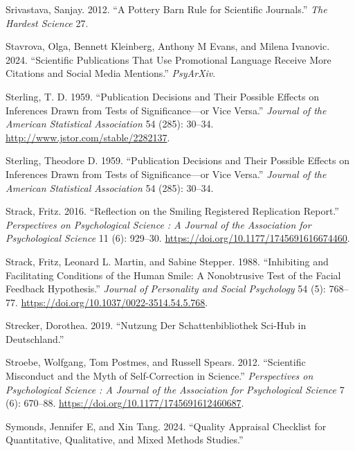 \documentclass[
  letterpaper,
  DIV=11,
  numbers=noendperiod]{scrreprt}
\newlength{\cslhangindent}
\newenvironment{CSLReferences}[2] %
 {\begin{list}{}{%
  \setlength{\itemindent}{0pt}
  \setlength{\leftmargin}{0pt}
  \setlength{\parsep}{0pt}
  \ifodd #1
   \setlength{\leftmargin}{\cslhangindent}
   \setlength{\itemindent}{-1\cslhangindent}
  \fi
  \setlength{\itemsep}{#2\baselineskip}}}
 {\end{list}}
\begin{document}
\begin{CSLReferences}{1}{0}
Srivastava, Sanjay. 2012. {``A Pottery Barn Rule for Scientific
Journals.''} \emph{The Hardest Science} 27.

Stavrova, Olga, Bennett Kleinberg, Anthony M Evans, and Milena Ivanovic.
2024. {``Scientific Publications That Use Promotional Language Receive
More Citations and Social Media Mentions.''} \emph{PsyArXiv}.

Sterling, T. D. 1959. {``Publication Decisions and Their Possible
Effects on Inferences Drawn from Tests of Significance---or Vice
Versa.''} \emph{Journal of the American Statistical Association} 54
(285): 30--34. \url{http://www.jstor.com/stable/2282137}.

Sterling, Theodore D. 1959. {``Publication Decisions and Their Possible
Effects on Inferences Drawn from Tests of Significance---or Vice
Versa.''} \emph{Journal of the American Statistical Association} 54
(285): 30--34.

Strack, Fritz. 2016. {``Reflection on the Smiling Registered Replication
Report.''} \emph{Perspectives on Psychological Science : A Journal of
the Association for Psychological Science} 11 (6): 929--30.
\url{https://doi.org/10.1177/1745691616674460}.

Strack, Fritz, Leonard L. Martin, and Sabine Stepper. 1988.
{``Inhibiting and Facilitating Conditions of the Human Smile: A
Nonobtrusive Test of the Facial Feedback Hypothesis.''} \emph{Journal of
Personality and Social Psychology} 54 (5): 768--77.
\url{https://doi.org/10.1037/0022-3514.54.5.768}.

Strecker, Dorothea. 2019. {``Nutzung Der Schattenbibliothek Sci-Hub in
Deutschland.''}

Stroebe, Wolfgang, Tom Postmes, and Russell Spears. 2012. {``Scientific
Misconduct and the Myth of Self-Correction in Science.''}
\emph{Perspectives on Psychological Science : A Journal of the
Association for Psychological Science} 7 (6): 670--88.
\url{https://doi.org/10.1177/1745691612460687}.

Symonds, Jennifer E, and Xin Tang. 2024. {``Quality Appraisal Checklist
for Quantitative, Qualitative, and Mixed Methods Studies.''}


\end{CSLReferences}
\end{document}
